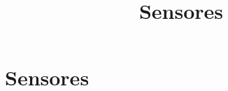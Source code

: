 \documentclass[compress]{beamer}
\title{Sensores}
\author{}
\institute{Universidad Nacional de Rosario}
\date{}
\begin{document}
\frame{\titlepage}

\section{Sensores}



























\end{document}
